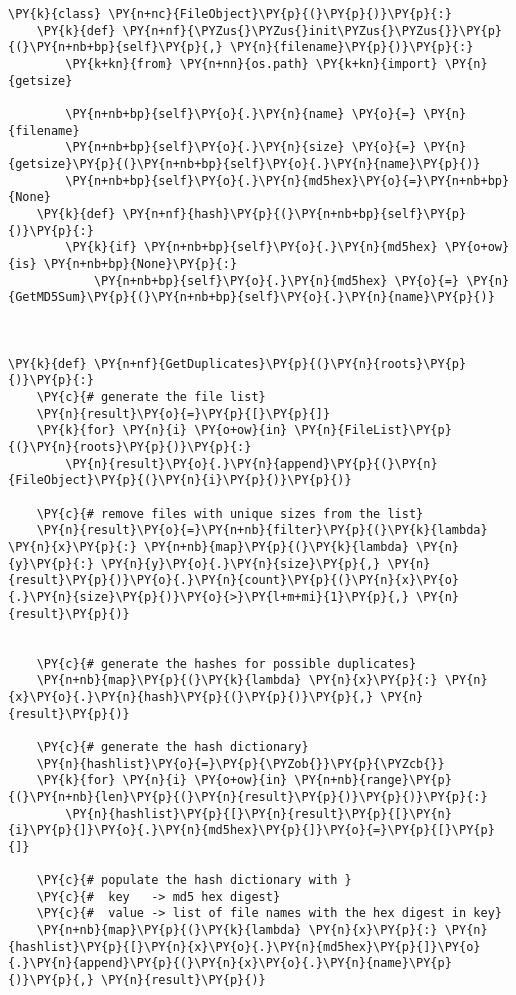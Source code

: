 \begin{Verbatim}[commandchars=\\\{\}]
\PY{k}{class} \PY{n+nc}{FileObject}\PY{p}{(}\PY{p}{)}\PY{p}{:}
    \PY{k}{def} \PY{n+nf}{\PYZus{}\PYZus{}init\PYZus{}\PYZus{}}\PY{p}{(}\PY{n+nb+bp}{self}\PY{p}{,} \PY{n}{filename}\PY{p}{)}\PY{p}{:}
        \PY{k+kn}{from} \PY{n+nn}{os.path} \PY{k+kn}{import} \PY{n}{getsize}

        \PY{n+nb+bp}{self}\PY{o}{.}\PY{n}{name} \PY{o}{=} \PY{n}{filename}
        \PY{n+nb+bp}{self}\PY{o}{.}\PY{n}{size} \PY{o}{=} \PY{n}{getsize}\PY{p}{(}\PY{n+nb+bp}{self}\PY{o}{.}\PY{n}{name}\PY{p}{)}
        \PY{n+nb+bp}{self}\PY{o}{.}\PY{n}{md5hex}\PY{o}{=}\PY{n+nb+bp}{None}
    \PY{k}{def} \PY{n+nf}{hash}\PY{p}{(}\PY{n+nb+bp}{self}\PY{p}{)}\PY{p}{:}
        \PY{k}{if} \PY{n+nb+bp}{self}\PY{o}{.}\PY{n}{md5hex} \PY{o+ow}{is} \PY{n+nb+bp}{None}\PY{p}{:}
            \PY{n+nb+bp}{self}\PY{o}{.}\PY{n}{md5hex} \PY{o}{=} \PY{n}{GetMD5Sum}\PY{p}{(}\PY{n+nb+bp}{self}\PY{o}{.}\PY{n}{name}\PY{p}{)}



\PY{k}{def} \PY{n+nf}{GetDuplicates}\PY{p}{(}\PY{n}{roots}\PY{p}{)}\PY{p}{:}
    \PY{c}{# generate the file list}
    \PY{n}{result}\PY{o}{=}\PY{p}{[}\PY{p}{]}
    \PY{k}{for} \PY{n}{i} \PY{o+ow}{in} \PY{n}{FileList}\PY{p}{(}\PY{n}{roots}\PY{p}{)}\PY{p}{:}
        \PY{n}{result}\PY{o}{.}\PY{n}{append}\PY{p}{(}\PY{n}{FileObject}\PY{p}{(}\PY{n}{i}\PY{p}{)}\PY{p}{)}

    \PY{c}{# remove files with unique sizes from the list}
    \PY{n}{result}\PY{o}{=}\PY{n+nb}{filter}\PY{p}{(}\PY{k}{lambda} \PY{n}{x}\PY{p}{:} \PY{n+nb}{map}\PY{p}{(}\PY{k}{lambda} \PY{n}{y}\PY{p}{:} \PY{n}{y}\PY{o}{.}\PY{n}{size}\PY{p}{,} \PY{n}{result}\PY{p}{)}\PY{o}{.}\PY{n}{count}\PY{p}{(}\PY{n}{x}\PY{o}{.}\PY{n}{size}\PY{p}{)}\PY{o}{>}\PY{l+m+mi}{1}\PY{p}{,} \PY{n}{result}\PY{p}{)}
        
    
    \PY{c}{# generate the hashes for possible duplicates}
    \PY{n+nb}{map}\PY{p}{(}\PY{k}{lambda} \PY{n}{x}\PY{p}{:} \PY{n}{x}\PY{o}{.}\PY{n}{hash}\PY{p}{(}\PY{p}{)}\PY{p}{,} \PY{n}{result}\PY{p}{)}

    \PY{c}{# generate the hash dictionary}
    \PY{n}{hashlist}\PY{o}{=}\PY{p}{\PYZob{}}\PY{p}{\PYZcb{}}
    \PY{k}{for} \PY{n}{i} \PY{o+ow}{in} \PY{n+nb}{range}\PY{p}{(}\PY{n+nb}{len}\PY{p}{(}\PY{n}{result}\PY{p}{)}\PY{p}{)}\PY{p}{:}
        \PY{n}{hashlist}\PY{p}{[}\PY{n}{result}\PY{p}{[}\PY{n}{i}\PY{p}{]}\PY{o}{.}\PY{n}{md5hex}\PY{p}{]}\PY{o}{=}\PY{p}{[}\PY{p}{]}

    \PY{c}{# populate the hash dictionary with }
    \PY{c}{#  key   -> md5 hex digest}
    \PY{c}{#  value -> list of file names with the hex digest in key}
    \PY{n+nb}{map}\PY{p}{(}\PY{k}{lambda} \PY{n}{x}\PY{p}{:} \PY{n}{hashlist}\PY{p}{[}\PY{n}{x}\PY{o}{.}\PY{n}{md5hex}\PY{p}{]}\PY{o}{.}\PY{n}{append}\PY{p}{(}\PY{n}{x}\PY{o}{.}\PY{n}{name}\PY{p}{)}\PY{p}{,} \PY{n}{result}\PY{p}{)}



\end{Verbatim}
